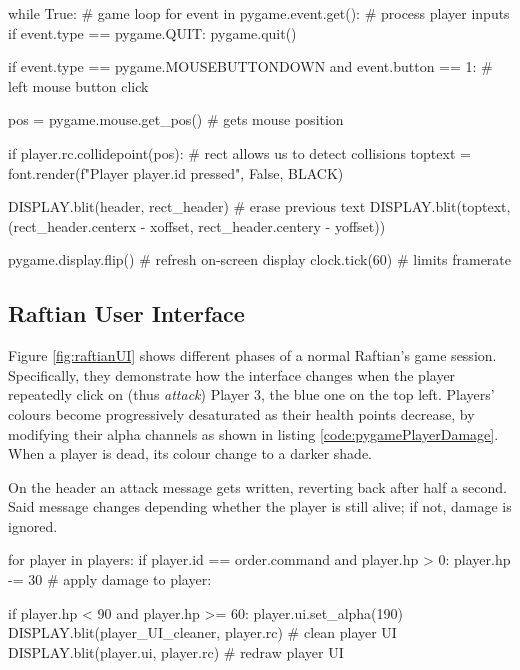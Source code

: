 \begin{python}[label={code:pygameLoop}, caption={All interactions and frame-by-frame rendering happen in the game loop}]
while True: # game loop
    for event in pygame.event.get():    # process player inputs
        if event.type == pygame.QUIT:
            pygame.quit()

        if event.type == pygame.MOUSEBUTTONDOWN and event.button == 1:  # left mouse button click

            pos = pygame.mouse.get_pos() # gets mouse position

            if player.rc.collidepoint(pos): # rect allows us to detect collisions
                toptext = font.render(f"Player {player.id} pressed", False, BLACK)

                DISPLAY.blit(header, rect_header)   # erase previous text
                DISPLAY.blit(toptext, (rect_header.centerx - xoffset, rect_header.centery - yoffset))

    pygame.display.flip()  # refresh on-screen display
    clock.tick(60)         # limits framerate
\end{python}

\subsection{Raftian User Interface}

Figure \ref{fig:raftianUI} shows different phases of a normal Raftian's game session. Specifically, they demonstrate how the interface changes when the player repeatedly click on (thus \textit{attack}) Player 3, the blue one on the top left. Players' colours become progressively desaturated as their health points decrease, by modifying their alpha channels as shown in listing \ref{code:pygamePlayerDamage}. When a player is dead, its colour change to a darker shade. 

On the header an attack message gets written, reverting back after half a second. Said message changes depending whether the player is still alive; if not, damage is ignored. 

\begin{python}[label={code:pygamePlayerDamage}, caption={Whenever a player gets damaged, its colour gets desaturated}]
for player in players:
    if player.id == order.command and player.hp > 0:
        player.hp -= 30  # apply damage to player:

        if player.hp < 90 and player.hp >= 60:
            player.ui.set_alpha(190)
            DISPLAY.blit(player_UI_cleaner, player.rc)  # clean player UI
            DISPLAY.blit(player.ui, player.rc)          # redraw player UI
\end{python}

